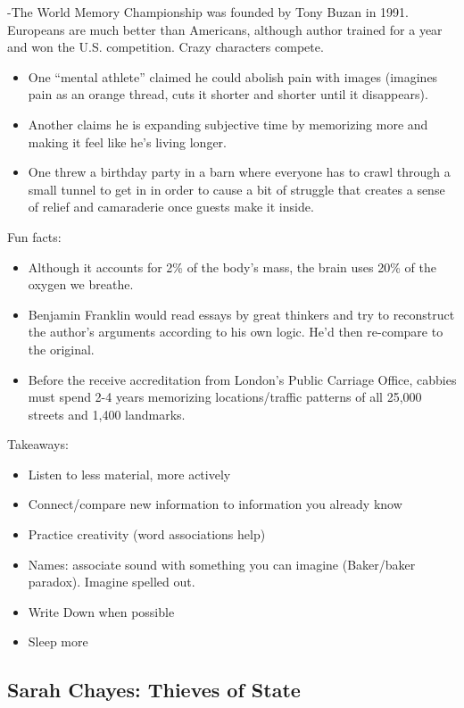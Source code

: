 \documentclass[
]{article}
\begin{document}
-The World Memory Championship was founded by Tony Buzan in 1991.
Europeans are much better than Americans, although author trained for a
year and won the U.S. competition. Crazy characters compete.

\begin{itemize}
\item
  One ``mental athlete'' claimed he could abolish pain with images
  (imagines pain as an orange thread, cuts it shorter and shorter until
  it disappears).
\item
  Another claims he is expanding subjective time by memorizing more and
  making it feel like he's living longer.
\item
  One threw a birthday party in a barn where everyone has to crawl
  through a small tunnel to get in in order to cause a bit of struggle
  that creates a sense of relief and camaraderie once guests make it
  inside.
\end{itemize}

Fun facts:

\begin{itemize}
\item
  Although it accounts for 2\% of the body's mass, the brain uses 20\%
  of the oxygen we breathe.
\item
  Benjamin Franklin would read essays by great thinkers and try to
  reconstruct the author's arguments according to his own logic. He'd
  then re-compare to the original.
\item
  Before the receive accreditation from London's Public Carriage Office,
  cabbies must spend 2-4 years memorizing locations/traffic patterns of
  all 25,000 streets and 1,400 landmarks.
\end{itemize}

Takeaways:

\begin{itemize}
\item
  Listen to less material, more actively
\item
  Connect/compare new information to information you already know
\item
  Practice creativity (word associations help)
\item
  Names: associate sound with something you can imagine (Baker/baker
  paradox). Imagine spelled out.
\item
  Write Down when possible
\item
  Sleep more
\end{itemize}

\hypertarget{sarah-chayes-thieves-of-state}{%
\subsection{Sarah Chayes: Thieves of
State}\label{sarah-chayes-thieves-of-state}}
\end{document}

